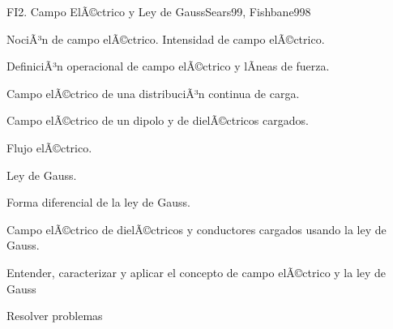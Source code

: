 \begin{syllabus}
\begin{unit}{FI2. Campo ElÃ©ctrico y Ley de Gauss}{Sears99, Fishbane99}{8}
   \begin{topics}
         \item  NociÃ³n de campo elÃ©ctrico.  Intensidad de campo elÃ©ctrico.
	 \item  DefiniciÃ³n operacional de campo elÃ©ctrico y lÃ­neas de fuerza.
         \item  Campo elÃ©ctrico de una distribuciÃ³n continua de carga.
	 \item  Campo elÃ©ctrico de un dipolo y de dielÃ©ctricos cargados.
         \item  Flujo elÃ©ctrico.
	 \item  Ley de Gauss.
         \item  Forma diferencial de la ley de Gauss.
	 \item  Campo elÃ©ctrico de dielÃ©ctricos y conductores cargados usando la ley de Gauss.
   \end{topics}

   \begin{unitgoals}
         \item  Entender, caracterizar y aplicar el concepto de campo elÃ©ctrico y la ley de Gauss
         \item  Resolver problemas
   \end{unitgoals}
\end{unit}


\end{syllabus}
